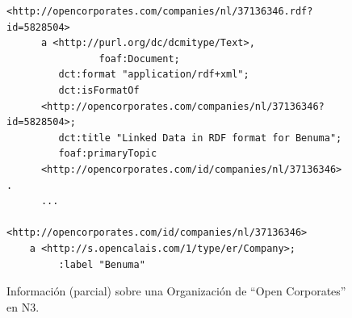 \begin{figure}[!h]
\begin{center}
\begin{lstlisting}[language=SPARQL]
    <http://opencorporates.com/companies/nl/37136346.rdf?id=5828504>    
      a <http://purl.org/dc/dcmitype/Text>,
                foaf:Document;
         dct:format "application/rdf+xml";
         dct:isFormatOf 
	  <http://opencorporates.com/companies/nl/37136346?id=5828504>;
         dct:title "Linked Data in RDF format for Benuma";
         foaf:primaryTopic 
	  <http://opencorporates.com/id/companies/nl/37136346> .
	  ...
        <http://opencorporates.com/id/companies/nl/37136346>     
	a <http://s.opencalais.com/1/type/er/Company>;
         :label "Benuma" 
\end{lstlisting}
\caption{Información (parcial) sobre una Organización de ``Open Corporates'' en N3.}
\label{figure:open-org}
\end{center}
\end{figure}



